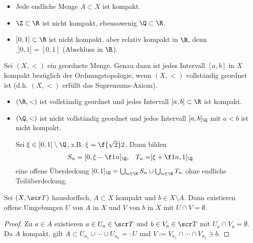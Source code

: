 \begin{ex}
	\begin{itemize}
		\item
			Jede endliche Menge $A \subset X$ ist kompakt.
		\item
			$\Z \subset \R$ ist nicht kompakt, ebensowenig $\Q \subset \R$.
		\item
			$]0,1] \subset \R$ ist nicht kompakt, aber relativ kompakt in $\R$, denn $\_{]0,1]} = [0,1]$ (Abschluss in $\R$).
	\end{itemize}
\end{ex}

\begin{st}
	Sei $(X, <)$ ein geordnete Menge.
	Genau dann ist jedes Intervall $[a,b]$ in $X$ kompakt bezüglich der Ordnungstopologie, wenn $(X, <)$ vollständig geordnet ist (d.h. $(X,<)$ erfüllt das Supremums-Axiom).
\end{st}

\begin{ex}
	\begin{itemize}
		\item
			$(\R, <)$ ist vollständig geordnet und jedes Intervall $[a,b] \subset \R$ ist kompakt.
		\item
			$(\Q, <)$ ist nicht vollständig geordnet und jedes Intervall $[a,b]_\Q$ mit $a<b$ ist nicht kompakt.

			Sei $\xi \in [0,1] \setminus \Q$, z.B. $\xi = \f{\sqrt 2}2$.
			Dann bilden
			\begin{align*}
				S_n &= [0, \xi - \f 1n[_{\Q},&
				T_n &= ]\xi + \f 1n, 1]_{\Q}
			\end{align*}
			eine offene Überdeckung $[0,1]_{\Q} = \bigcup_{n\in\N} S_n \cup \bigcup_{n\in\N} T_n$ ohne endliche Teilüberdeckung.
	\end{itemize}
\end{ex}

\begin{lem} \label{lem:hausdorff_compact_subspace_neighbourhood}
	Sei $(X, \scr T)$ hausdorffsch, $A \subset X$ kompakt und $b \in X \setminus A$.
	Dann existieren offene Umgebungen $U$ von $A$ in $X$ und $V$ von $b$ in $X$ mit $U\cap V = \emptyset$.
	\begin{proof}
		Zu $a \in A$ existieren $a \in U_a \in \scr T$ und $b \in V_a \in \scr T$ mit $U_a \cap V_a = \emptyset$.
		Da $A$ kompakt, gilt $A \subset U_{a_1} \cup \dotsb \cup U_{a_n} =: U$ und $V := V_{a_1} \cap \dotsb \cap V_{a_1} \ni b$.
	\end{proof}
\end{lem}

